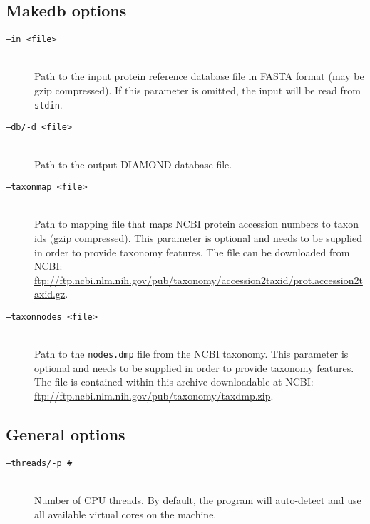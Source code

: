 \documentclass[11pt]{article}
\begin{document}
\subsection{Makedb options}
\begin{description}
\item[\texttt{--in <file>}]\hfill\\
Path to the input protein reference database file in FASTA format (may be gzip compressed). If this parameter is omitted, the input will be read from \texttt{stdin}.
\item[\texttt{--db/-d <file>}]\hfill\\
Path to the output DIAMOND database file.
\item[\texttt{--taxonmap <file>}]\hfill\\
Path to mapping file that maps NCBI protein accession numbers to taxon ids (gzip compressed). This parameter is  optional and needs to be supplied in order to provide taxonomy features. The file can be downloaded from NCBI: \url{ftp://ftp.ncbi.nlm.nih.gov/pub/taxonomy/accession2taxid/prot.accession2taxid.gz}.
\item[\texttt{--taxonnodes <file>}]\hfill\\
Path to the \texttt{nodes.dmp} file from the NCBI taxonomy.  This parameter is  optional and needs to be supplied in order to provide taxonomy features. The file is contained within this archive downloadable at NCBI: \url{ftp://ftp.ncbi.nlm.nih.gov/pub/taxonomy/taxdmp.zip}.
\end{description}

\subsection{General options}
\label{subsec:general}
\begin{description}
\item[\texttt{--threads/-p \#}]\hfill\\
Number of CPU threads. By default, the program will auto-detect and use all available virtual cores on the machine.
\end{description}
\end{document}
